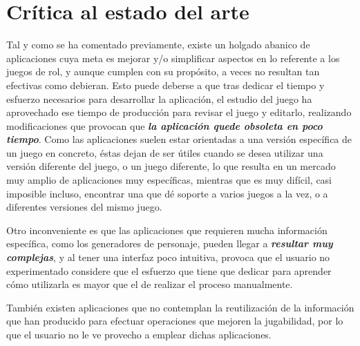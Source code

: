

\section{Crítica al estado del arte} \label{Critica_Estado_Arte}
Tal y como se ha comentado previamente, existe un holgado abanico de 
aplicaciones cuya meta es mejorar y/o simplificar aspectos en lo referente a 
los juegos de rol, y aunque cumplen con su propósito, a veces no resultan 
tan efectivas como debieran. 
\newpage
Esto puede deberse a que tras dedicar el tiempo y esfuerzo necesarios para 
desarrollar la aplicación, el estudio del juego ha aprovechado ese tiempo 
de producción para revisar el juego y editarlo, realizando modificaciones 
que provocan que \emph{\textbf{la aplicación quede obsoleta en poco tiempo}}. 
Como las aplicaciones suelen estar orientadas a una versión específica de un juego en concreto, 
éstas dejan de ser útiles cuando se desea utilizar una versión diferente del juego, o un juego 
diferente, lo que resulta en un mercado muy amplio de aplicaciones muy específicas, mientras que 
es muy difícil, casi imposible incluso, encontrar una que dé soporte a varios juegos a la vez, 
o a diferentes versiones del mismo juego. \medskip

Otro inconveniente es que las aplicaciones que requieren mucha información 
específica, como los generadores de personaje, pueden llegar a 
\emph{\textbf{resultar muy complejas}}, y al tener una interfaz poco intuitiva, 
provoca que el usuario no experimentado considere que el esfuerzo que tiene que 
dedicar para aprender cómo utilizarla es mayor que el de realizar el proceso manualmente. \medskip

También existen aplicaciones que no contemplan la reutilización de la 
información que han producido para efectuar operaciones que mejoren 
la jugabilidad, por lo que el usuario no le ve provecho a emplear dichas
aplicaciones.